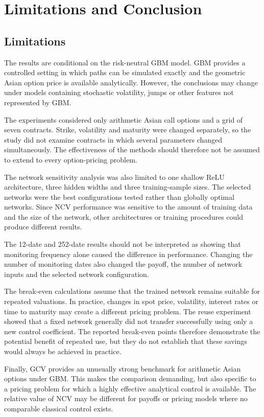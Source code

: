 \chapter{Limitations and Conclusion}

\section{Limitations}

The results are conditional on the risk-neutral GBM model. GBM provides a controlled setting in which paths can be simulated exactly and the geometric Asian option price is available analytically. However, the conclusions may change under models containing stochastic volatility, jumps or other features not represented by GBM.

The experiments considered only arithmetic Asian call options and a grid of seven contracts. Strike, volatility and maturity were changed separately, so the study did not examine contracts in which several parameters changed simultaneously. The effectiveness of the methods should therefore not be assumed to extend to every option-pricing problem.

The network sensitivity analysis was also limited to one shallow ReLU architecture, three hidden widths and three training-sample sizes. The selected networks were the best configurations tested rather than globally optimal networks. Since NCV performance was sensitive to the amount of training data and the size of the network, other architectures or training procedures could produce different results.

The 12-date and 252-date results should not be interpreted as showing that monitoring frequency alone caused the difference in performance. Changing the number of monitoring dates also changed the payoff, the number of network inputs and the selected network configuration.

The break-even calculations assume that the trained network remains suitable for repeated valuations. In practice, changes in spot price, volatility, interest rates or time to maturity may create a different pricing problem. The reuse experiment showed that a fixed network generally did not transfer successfully using only a new control coefficient. The reported break-even points therefore demonstrate the potential benefit of repeated use, but they do not establish that these savings would always be achieved in practice.

Finally, GCV provides an unusually strong benchmark for arithmetic Asian options under GBM. This makes the comparison demanding, but also specific to a pricing problem for which a highly effective analytical control is available. The relative value of NCV may be different for payoffs or pricing models where no comparable classical control exists.

